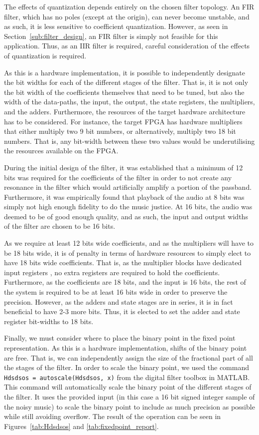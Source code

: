 \documentclass[]{article}
\begin{document}
The effects of quantization depends entirely on the chosen filter topology. An FIR filter, which has no poles (except at the origin), can never become unstable, and as such, it is less sensitive to coefficient quantization. However, as seen in Section~\ref{sub:filter_design}, an FIR filter is simply not feasible for this application. Thus, as an IIR filter is required, careful consideration of the effects of quantization is required.

As this is a hardware implementation, it is possible to independently designate the bit widths for each of the different stages of the filter. That is, it is not only the bit width of the coefficients themselves that need to be tuned, but also the width of the data-paths, the input, the output, the state registers, the multipliers, and the adders. Furthermore, the resources of the target hardware architecture has to be considered.
For instance, the target FPGA has hardware multipliers that either multiply two 9 bit numbers, or alternatively, multiply two 18 bit numbers. That is, any bit-width between these two values would be underutilising the resources available on the FPGA.

During the initial design of the filter, it was established that a minimum of 12 bits was required for the coefficients of the filter in order to not create any resonance in the filter which would artificially amplify a portion of the passband.
Furthermore, it was empirically found that playback of the audio at 8 bits was simply not high enough fidelity to do the music justice. At 16 bits, the audio was deemed to be of good enough quality, and as such, the input and output widths of the filter are chosen to be 16 bits.

As we require at least 12 bits wide coefficients, and as the multipliers will have to be 18 bits wide, it is of penalty in terms of hardware resources to simply elect to have 18 bits wide coefficients. That is, as the multiplier blocks have dedicated input registers \cite{multipliers}, no extra registers are required to hold the coefficients.
Furthermore, as the coefficients are 18 bits, and the input is 16 bits, the rest of the system is required to be at least 16 bits wide in order to preserve the precision. However, as the adders and state stages are in series, it is in fact beneficial to have 2-3 more bits. Thus, it is elected to set the adder and state register bit-widths to 18 bits.

Finally, we must consider where to place the binary point in the fixed point representation. As this is a hardware implementation, shifts of the binary point are free. That is, we can independently assign the size of the fractional part of all the stages of the filter. 
In order to scale the binary point, we used the command \verb"Hdsdsos = autoscale(Hdsdsos, x)" from the digital filter toolbox in MATLAB.
This command will automatically scale the binary point of the different stages of the filter. It uses the provided input (in this case a 16 bit signed integer sample of the noisy music) to scale the binary point to include as much precision as possible while still avoiding overflow. The result of the operation can be seen in Figures~\ref{tab:Hdsdsos} and \ref{tab:fixedpoint_report}.
\end{document}
